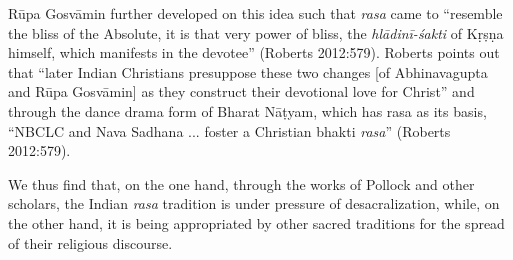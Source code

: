 Rūpa Gosvāmin further developed on this idea such that \textsl{rasa} came to ``resemble the bliss of the Absolute, it is that very power of bliss, the \textsl{hlādinī-śakti} of Kṛṣṇa himself, which manifests in the devotee'' (Roberts 2012:579). Roberts points out that ``later Indian Christians presuppose these two changes [of Abhinavagupta and Rūpa Gosvāmin] as they construct their devotional love for Christ'' and through the dance drama form of Bharat Nāṭyam, which has rasa as its basis, ``NBCLC and Nava Sadhana ... foster a Christian bhakti \textsl{rasa}'' (Roberts 2012:579). 
\eject

We thus find that, on the one hand, through the works of Pollock and other scholars, the Indian \textsl{rasa} tradition is under pressure of desacralization, while, on the other hand, it is being appropriated by other sacred traditions for the spread of their religious discourse.


